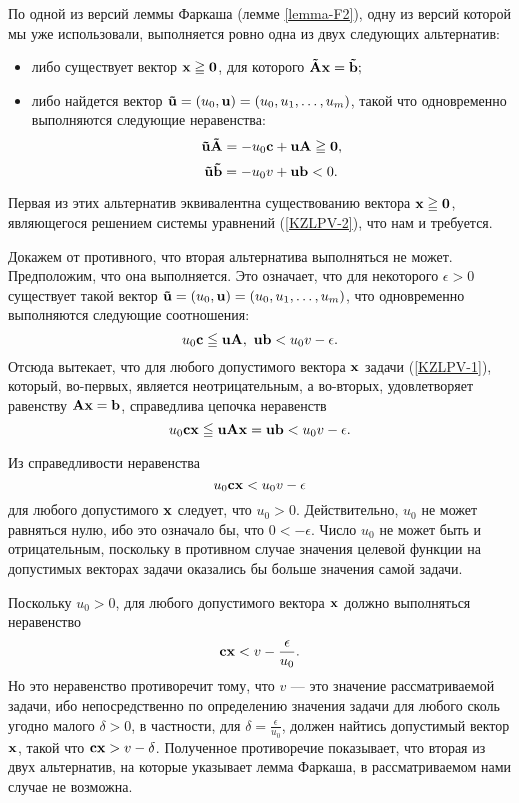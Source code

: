     По одной из версий леммы Фаркаша (лемме \ref{lemma-F2}), одну из версий которой
    мы уже использовали, выполняется ровно одна из двух следующих альтернатив:
\begin{itemize}
    \item [1)\ ] либо существует вектор $\mathbf{x} \geqq \mathbf{0}$, для
    которого $\mathbf{\tilde{A}}\mathbf{x}=\mathbf{\tilde{b}};$
    \item [2)\ ] либо найдется вектор
    $\mathbf{\tilde{u}}=(u_{0},\mathbf{u})=(u_{0},u_{1},\ldots,u_{m})$,
    такой что одновременно выполняются следующие неравенства:
    \[\mathbf{\tilde{u}}\mathbf{\tilde{A}}=-u_{0}\mathbf{c}+\mathbf{u}\mathbf{A}\geqq\mathbf{0},\]
    \[\mathbf{\tilde{u}}\mathbf{\tilde{b}}=-u_{0}v+\mathbf{u}\mathbf{b}<0.\]
\end{itemize}

    Первая из этих альтернатив эквивалентна существованию вектора
    $\mathbf{x}\geqq\mathbf{0}$, являющегося решением системы уравнений
    (\ref{KZLPV-2}), что нам и требуется.

    Докажем от противного, что вторая альтернатива выполняться не
    может. Предположим, что она выполняется. Это означает, что для некоторого
    $\epsilon>0$ существует такой вектор
    $\mathbf{\tilde{u}}=(u_{0},\mathbf{u})=(u_{0},u_{1},\ldots,u_{m})$, что
    одновременно выполняются следующие соотношения:
    \[u_{0}\vc{c}\leqq\vc{u}\vc{A}, \ \vc{u}\vc{b}<u_{0}v-\epsilon.\]
    Отсюда вытекает, что для любого допустимого вектора $\mathbf{x}$ задачи (\ref{KZLPV-1}),
    который, во-первых, является неотрицательным, а во-вторых,
    удовлетворяет равенству $\mathbf{A} \mathbf{x} = \mathbf{b}$, справедлива
    цепочка неравенств
    \[u_{0}\mathbf{c}\mathbf{x}\leqq\mathbf{u}\mathbf{A}\mathbf{x}=\mathbf{u}\mathbf{b}<u_{0}v-\epsilon.\]

    Из справедливости неравенства
    \[u_{0}\mathbf{c}\mathbf{x}<u_{0}v-\epsilon\]
    для любого допустимого $\mathbf{x}$ следует, что $u_{0}>0$.
    Действительно, $u_{0}$ не может равняться нулю, ибо это
    означало бы, что $0<-\epsilon$. Число $u_{0}$ не может быть и отрицательным,
    поскольку в противном случае значения целевой функции на допустимых векторах задачи
    оказались бы больше значения самой задачи.

    Поскольку
    $u_{0}>0$, для любого допустимого вектора $\mathbf{x}$ должно
    выполняться неравенство
    \[\mathbf{c}\mathbf{x}<v-\frac{\epsilon}{u_{0}}.\]
    Но это неравенство противоречит тому, что $v$ --- это значение
    рассматриваемой задачи, ибо непосредственно по определению значения задачи
         для любого сколь угодно малого
    $\delta>0$, в частности, для $\delta=\frac{\epsilon}{u_{0}}$,
    должен найтись допустимый вектор $\mathbf{x}$, такой что
    $\mathbf{c}\mathbf{x}>v-\delta$. Полученное противоречие показывает, что
    вторая из двух альтернатив, на которые указывает лемма Фаркаша,
    в рассматриваемом нами случае не возможна.

